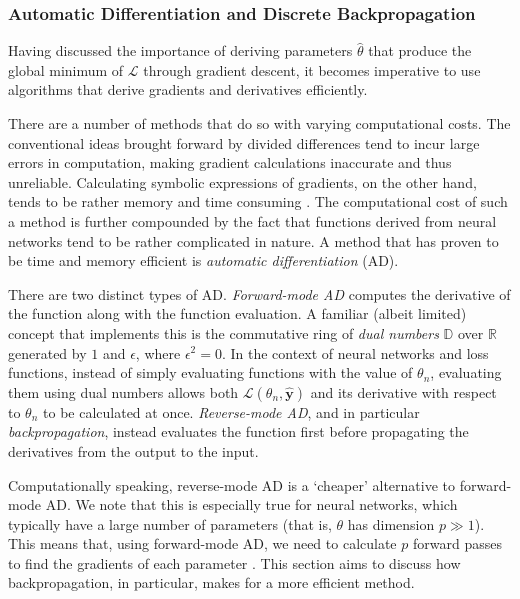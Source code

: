 \documentclass[a4paper,11pt,titlepage]{article}
\theoremstyle{definition}
\theoremstyle{plain}
\theoremstyle{remark}
\begin{document}
\subsubsection{Automatic Differentiation and Discrete Backpropagation}
\label{sec:ad}

Having discussed the importance of deriving parameters $\hat{\theta}$ that produce the global minimum of $\mathcal{L}$ through gradient descent, it becomes imperative to use algorithms that derive gradients and derivatives efficiently.

There are a number of methods that do so with varying computational costs. The conventional ideas brought forward by divided differences tend to incur large errors in computation, making gradient calculations inaccurate and thus unreliable. Calculating symbolic expressions of gradients, on the other hand, tends to be rather memory and time consuming \cite{tucker2011}. The computational cost of such a method is further compounded by the fact that functions derived from neural networks tend to be rather complicated in nature. A method that has proven to be time and memory efficient is \textit{automatic differentiation} (AD).

There are two distinct types of AD. \textit{Forward-mode AD} computes the derivative of the function along with the function evaluation. A familiar (albeit limited) concept that implements this is the commutative ring of \textit{dual numbers} $\mathbb{D}$ over $\mathbb{R}$ generated by $1$ and $\epsilon$, where $\epsilon^2 = 0$. In the context of neural networks and loss functions, instead of simply evaluating functions with the value of $\theta_n$, evaluating them using dual numbers allows both $\mathcal{L}(\theta_n, \mathbf{\hat{y}})$ and its derivative with respect to $\theta_n$ to be calculated at once. \textit{Reverse-mode AD}, and in particular \textit{backpropagation}, instead evaluates the function first before propagating the derivatives from the output to the input. 

Computationally speaking, reverse-mode AD is a ‘cheaper’ alternative to forward-mode AD. We note that this is especially true for neural networks, which typically have a large number of parameters (that is, $\theta$ has dimension $p \gg 1$). This means that, using forward-mode AD, we need to calculate $p$ forward passes to find the gradients of each parameter \cite{griewank2008}. This section aims to discuss how backpropagation, in particular, makes for a more efficient method.
\end{document}
